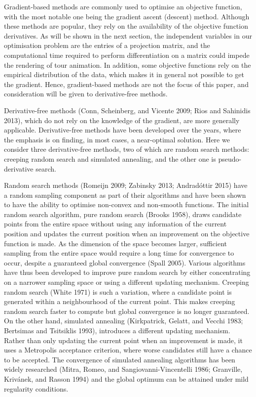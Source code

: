 Gradient-based methods are commonly used to optimise an objective function, with the most notable one being the gradient ascent (descent) method. Although these methods are popular, they rely on the availability of the objective function derivatives. As will be shown in the next section, the independent variables in our optimisation problem are the entries of a projection matrix, and the computational time required to perform differentiation on a matrix could impede the rendering of tour animation. In addition, some objective functions rely on the empirical distribution of the data, which makes it in general not possible to get the gradient. Hence, gradient-based methods are not the focus of this paper, and consideration will be given to derivative-free methods.

Derivative-free methods (Conn, Scheinberg, and Vicente 2009; Rios and Sahinidis 2013), which do not rely on the knowledge of the gradient, are more generally applicable. Derivative-free methods have been developed over the years, where the emphasis is on finding, in most cases, a near-optimal solution. Here we consider three derivative-free methods, two of which are random search methods: creeping random search and simulated annealing, and the other one is pseudo-derivative search.

Random search methods (Romeijn 2009; Zabinsky 2013; Andradóttir 2015) have a random sampling component as part of their algorithms and have been shown to have the ability to optimise non-convex and non-smooth functions. The initial random search algorithm, pure random search (Brooks 1958), draws candidate points from the entire space without using any information of the current position and updates the current position when an improvement on the objective function is made. As the dimension of the space becomes larger, sufficient sampling from the entire space would require a long time for convergence to occur, despite a guaranteed global convergence (Spall 2005). Various algorithms have thus been developed to improve pure random search by either concentrating on a narrower sampling space or using a different updating mechanism. Creeping random search (White 1971) is such a variation, where a candidate point is generated within a neighbourhood of the current point. This makes creeping random search faster to compute but global convergence is no longer guaranteed. On the other hand, simulated annealing (Kirkpatrick, Gelatt, and Vecchi 1983; Bertsimas and Tsitsiklis 1993), introduces a different updating mechanism. Rather than only updating the current point when an improvement is made, it uses a Metropolis acceptance criterion, where worse candidates still have a chance to be accepted. The convergence of simulated annealing algorithms has been widely researched (Mitra, Romeo, and Sangiovanni-Vincentelli 1986; Granville, Krivánek, and Rasson 1994) and the global optimum can be attained under mild regularity conditions.

